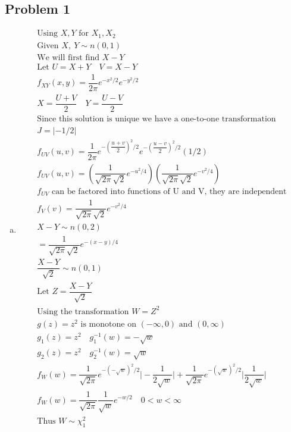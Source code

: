 \documentclass{article}
\begin{document}
\begin{flushleft}
\section*{Problem 1}
\begin{enumerate}[(a)]
\item
\begin{multline*}
\text{Using } X,Y \text{ for } X_1,X_2\\
\text{Given } X, \ Y \sim n(0,1)\\
\text{We will first find } X-Y\\
\text{Let } U=X+Y \quad V=X-Y\\
f_{XY}(x,y)=\dfrac{1}{2\pi}e^{-x^2/2}e^{-y^2/2}\\
X=\dfrac{U+V}{2} \quad Y=\dfrac{U-V}{2}\\
\text{Since this solution is unique we have a one-to-one transformation}\\
J=|-1/2|\\
f_{UV}(u,v)=\dfrac{1}{2\pi}e^{-\left(\dfrac{u+v}{2}\right)^2/2}e^{-\left(\dfrac{u-v}{2}\right)^2/2}(1/2)\\
f_{UV}(u,v)=\left(\dfrac{1}{\sqrt{2\pi}\sqrt{2}}e^{-u^2/4}\right)\left(\dfrac{1}{\sqrt{2\pi}\sqrt{2}}e^{-v^2/4}\right)\\
f_{UV} \text{ can be factored into functions of U and V, they are independent}\\
f_V(v)=\dfrac{1}{\sqrt{2\pi}\sqrt{2}}e^{-v^2/4}\\
X-Y \sim n(0,2)\\
=\dfrac{1}{\sqrt{2\pi}\sqrt{2}}e^{-(x-y)/4}\\
\dfrac{X-Y}{\sqrt{2}} \sim n(0,1)\\
\text{Let } Z=\dfrac{X-Y}{\sqrt{2}}\\
\text{Using the transformation } W=Z^2\\
g(z)=z^2 \text{ is monotone on } (-\infty,0) \text{ and }
(0,\infty)\\
g_1(z)=z^2 \quad g_1^{-1}(w)=-\sqrt{w}\\
g_2(z)=z^2 \quad g_2^{-1}(w)=\sqrt{w}\\
f_W(w)=\dfrac{1}{\sqrt{2\pi}}e^{-(-\sqrt{w})^2/2}\bigg|-\dfrac{1}{2\sqrt{w}}\bigg|+\dfrac{1}{\sqrt{2\pi}}e^{-(\sqrt{w})^2/2}\bigg|\dfrac{1}{2\sqrt{w}}\bigg|\\
f_W(w)=\dfrac{1}{\sqrt{2\pi}}\dfrac{1}{\sqrt{w}}e^{-w/2} \quad 0<w<\infty\\
\text{Thus } W\sim \chi_1^2\\

\end{multline*}
\end{enumerate}
\end{flushleft}
\end{document}
